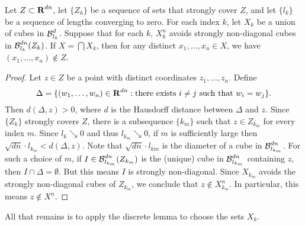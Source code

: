 \begin{lemma} \label{stronglydiagonal}
	Let $Z \subset \operatorname{\mathbf{R}}^{dn}$, let $\{Z_k\}$ be a sequence of sets that strongly cover $Z$, and let $\{ l_k \}$ be a sequence of lengths converging to zero. For each index $k$, let $X_k$ be a union of cubes in $\operatorname{\mathcal{B}}^d_{l_k}$. Suppose that for each $k$, $X_k^n$ avoids strongly non-diagonal cubes in $\operatorname{\mathcal{B}}^{dn}_{l_k}(Z_k)$. If $X = \bigcap X_k$, then for any distinct $x_1, \dots, x_n \in X$, we have $(x_1, \dots, x_n) \not \in Z$.
\end{lemma}
\begin{proof}
	Let $z \in Z$ be a point with distinct coordinates $z_1, \dots, z_n$. Define
	\[ \Delta = \{ (w_1, \dots, w_n) \in \operatorname{\mathbf{R}}^{dn}: \text{there exists $i \neq j$ such that $w_i = w_j$} \}. \]
	Then $d(\Delta,z) > 0$, where $d$ is the Hausdorff distance between $\Delta$ and $z$. Since $\{ Z_k \}$ strongly covers $Z$, there is a subsequence $\{ k_m \}$ such that $z \in Z_{k_m}$ for every index $m$. Since $l_k \searrow 0$ and thus $l_{k_m}\searrow 0$, if $m$ is sufficiently large then $\sqrt{dn} \cdot l_{k_m} < d(\Delta,z)$. Note that $\sqrt{dn} \cdot l_{km}$ is the diameter of a cube in $\operatorname{\mathcal{B}}_{l_{k_m}}^{dn}$. For such a choice of $m$, if $I\in \operatorname{\mathcal{B}}_{l_{k_m}}^{dn}(Z_{k_m})$ is the (unique) cube in $\operatorname{\mathcal{B}}_{l_{k_m}}^{dn}$ containing $z$, then $I \cap \Delta = \emptyset$. But this means $I$ is strongly non-diagonal. Since $X_{k_m}$ avoids the strongly non-diagonal cubes of $Z_{k_m}$, we conclude that $z \not \in X_{k_m}^n$. In particular, this means $z \not\in X^n$.
\end{proof}

All that remains is to apply the discrete lemma to choose the sets $X_k$.

